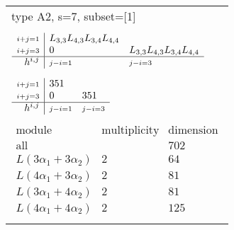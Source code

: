 \documentclass[crop,border=2mm]{standalone}
\begin{document}
\begin{tabular}{l}
{\huge type A2, s=7, subset=[1]}\\ \\


$\displaystyle
\begin{array}{r|l l}
	{\scriptstyle i+j=1}&L_{3,3}L_{4,3}L_{3,4}L_{4,4}&\\
	{\scriptstyle i+j=3}&0&L_{3,3}L_{4,3}L_{3,4}L_{4,4}\\
	\hline h^{i,j}&{\scriptstyle j-i=1}&{\scriptstyle j-i=3}
\end{array}
$ \\ \\


$\displaystyle
\begin{array}{r|l l}
	{\scriptstyle i+j=1}&351&\\
	{\scriptstyle i+j=3}&0&351\\
	\hline h^{i,j}&{\scriptstyle j-i=1}&{\scriptstyle j-i=3}
\end{array}
$ \\ \\


$\displaystyle
\begin{array}{rll}
	\text{module}&\text{multiplicity}&\text{dimension} \\ \hline \text{all}&&702 \\
	L\left( 3\alpha_{1}+ 3\alpha_{2}\right)&2&64\\
	L\left( 4\alpha_{1}+ 3\alpha_{2}\right)&2&81\\
	L\left( 3\alpha_{1}+ 4\alpha_{2}\right)&2&81\\
	L\left( 4\alpha_{1}+ 4\alpha_{2}\right)&2&125
\end{array}
$ \\ \\

\end{tabular}
\end{document}
